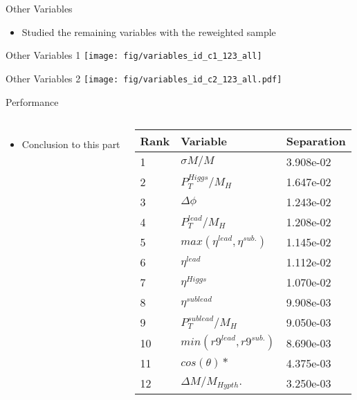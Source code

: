 \documentclass[t]{beamer}
\begin{document}
\begin{frame}{Other Variables}
  \begin{itemize}  
   \item Studied the remaining variables with the reweighted sample
   \end{itemize}
\end{frame}


\begin{frame}{Other Variables 1}
    \texttt{[image: fig/variables\_id\_c1\_123\_all]}
\end{frame}

\begin{frame}{Other Variables 2}
    \texttt{[image: fig/variables\_id\_c2\_123\_all.pdf]}
\end{frame}

\begin{frame}{Performance}
  \begin{columns}[c]
  \begin{itemize}
   \item Conclusion to this part
  \end{itemize}
  \begin{center}
    \begin{tabular}{ l | l | l } \hline
        Rank & Variable                     & Separation\\
        \hline
        1 & $\sigma M / M                 $ & 3.908e-02\\
        2 & $P_{T}^{Higgs}/M_{H}         $ & 1.647e-02\\
        3 & $\Delta \phi                 $ & 1.243e-02\\
        4 & $P_{T}^{lead} / M_{H}        $ & 1.208e-02\\
        5 & $max(\eta^{lead},\eta^{sub.})$ & 1.145e-02\\
        6 & $\eta^{lead}                 $ & 1.112e-02\\
        7 & $\eta^{Higgs}                $ & 1.070e-02\\
        8 & $\eta^{sublead}              $ & 9.908e-03\\
        9 & $P_{T}^{sublead} / M_{H}     $ & 9.050e-03\\
       10 & $min(r9^{lead},r9^{sub.})    $ & 8.690e-03\\
       11 & $cos(\theta)*                $ & 4.375e-03\\
       12 & $\Delta M / M_{Hypth}.        $ & 3.250e-03\\
       \hline
    \end{tabular}
  \end{center}
  \end{columns}
\end{frame}
\end{document}
